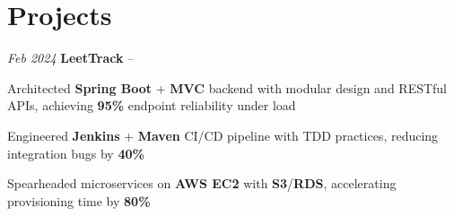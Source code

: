 \section{Projects}

\begin{twocolentry}{
    \textit{Feb 2024}
}{
    \textbf{LeetTrack} -- 
}
\end{twocolentry}
\begin{onecolentry}
    \begin{highlights}
        \item Architected \textbf{Spring Boot} + \textbf{MVC} backend with modular design and RESTful APIs, achieving \textbf{95\%} endpoint reliability under load
        \item Engineered \textbf{Jenkins} + \textbf{Maven} CI/CD pipeline with TDD practices, reducing integration bugs by \textbf{40\%}
        \item Spearheaded microservices on \textbf{AWS EC2} with \textbf{S3}/\textbf{RDS}, accelerating provisioning time by \textbf{80\%}
    \end{highlights}
\end{onecolentry}

